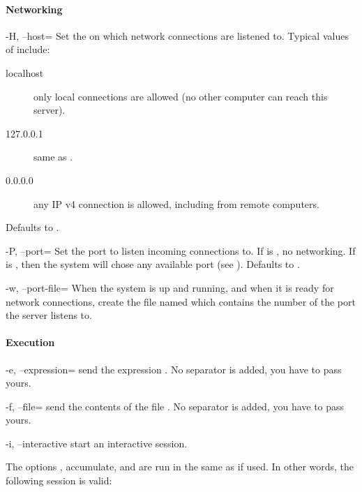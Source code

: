 \paragraph{Networking}
\begin{options}
\item[-H, --host=\var{address}] Set the  on which network
  connections are listened to.  Typical values of 
  include:
  \begin{description}
  \item[localhost] only local connections are allowed (no other
    computer can reach this server).
  \item[127.0.0.1] same as .
  \item[0.0.0.0] any IP v4 connection is allowed, including from
    remote computers.
  \end{description}
  Defaults to .
\item[-P, --port=\var{port}] Set the port to listen incoming
  connections to.  If  is , no networking.  If
   is , then the system will chose any available
  port (see ).  Defaults to .
\item[-w, --port-file=\var{file}] When the system is up and running,
  and when it is ready for network connections, create the file named
   which contains the number of the port the server listens
  to.
\end{options}


\paragraph{Execution}
\begin{options}
\item[-e, --expression=\var{exp}] send the \us expression .
  No separator is added, you have to pass yours.
\item[-f, --file=\var{file}] send the contents of the file .
  No separator is added, you have to pass yours.
\item[-i, --interactive] start an interactive session.
\end{options}

The options ,  accumulate, and are run in the
same  as  if used.  In other words, the
following session is valid:


